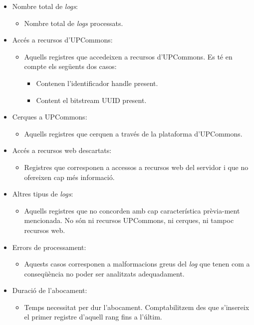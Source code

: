\begin{itemize}
    \item Nombre total de \textit{\gls{log}s}:
    \begin{itemize}
        \item Nombre total de \textit{logs} processats.
    \end{itemize}
    \item Accés a recursos d'\gls{UPCommons}:
    \begin{itemize}
        \item Aquells registres que accedeixen a recursos d’UPCommons. 
        Es té en compte els següents dos casos:
        \begin{itemize}
            \item Contenen l’identificador \gls{handle} present.
            \item Content el \gls{bitstream} \gls{UUID} present.
        \end{itemize}
    \end{itemize}
    \item Cerques a \gls{UPCommons}:
    \begin{itemize}
        \item Aquells registres que cerquen a través de la plataforma d’\gls{UPCommons}.
    \end{itemize}
    \item Accés a recursos web descartats:
    \begin{itemize}
        \item Registres que corresponen a accessos a recursos web del servidor i que no ofereixen cap més informació.
    \end{itemize}
    \item Altres tipus de \textit{logs}:
    \begin{itemize}
        \item Aquells registres que no concorden amb cap característica prèvia-ment mencionada.
        No són ni recursos \gls{UPCommons}, ni cerques, ni tampoc recursos web.
    \end{itemize}
    \item Errors de processament:
    \begin{itemize}
        \item Aquests casos corresponen a malformacions greus del \textit{\gls{log}} que tenen com a conseqüència no poder ser analitzats adequadament.
    \end{itemize}
    \item Duració de l’abocament:
    \begin{itemize}
        \item Temps necessitat per dur l’abocament.
        Comptabilitzem des que s’insereix el primer registre d’aquell rang fins a l’últim.
    \end{itemize}
\end{itemize}